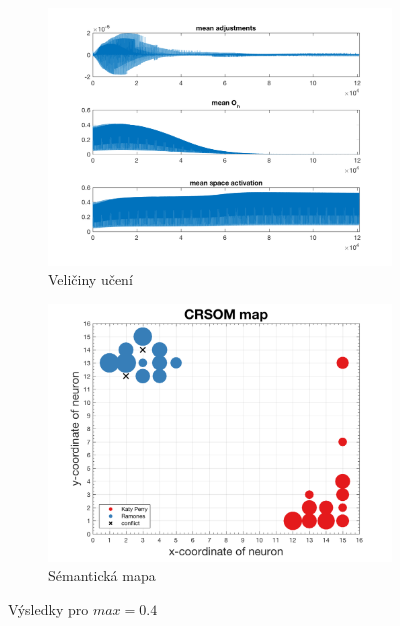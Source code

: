 \documentclass[thesis=M,czech]{FITthesis}[2012/06/26]
\begin{document}
\begin{figure}
\centering
\begin{subfigure}{.5\textwidth}
  \centering
  \includegraphics[width=.99\linewidth]{norm-learnattrs400.png}
  \caption{Veličiny učení}
  \label{fig:sub1}
\end{subfigure}%
\begin{subfigure}{.5\textwidth}
  \centering
  \includegraphics[width=.99\linewidth]{exp_kp_ram_crsom.png}
  \caption{Sémantická mapa}
  \label{fig:resmap400}
\end{subfigure}
\caption{Výsledky pro  $max=0.4$}
\label{fig:top}
\end{figure}
\end{document}
